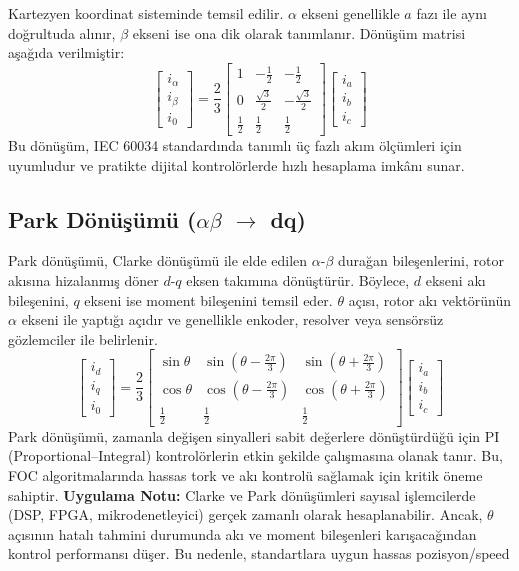 Kartezyen koordinat sisteminde temsil edilir. $\alpha$ ekseni genellikle $a$ fazı ile aynı doğrultuda alınır, $\beta$ ekseni ise ona dik olarak tanımlanır. Dönüşüm matrisi aşağıda verilmiştir: \begin{equation} \begin{bmatrix} i_\alpha \\ i_\beta \\ i_0 \end{bmatrix} = \frac{2}{3} \begin{bmatrix} 1 & -\frac{1}{2} & -\frac{1}{2} \\ 0 & \frac{\sqrt{3}}{2} & -\frac{\sqrt{3}}{2} \\ \frac12 & \frac12 & \frac12 \end{bmatrix} \begin{bmatrix} i_a \\ i_b \\ i_c \end{bmatrix} \end{equation} Bu dönüşüm, IEC 60034 standardında tanımlı üç fazlı akım ölçümleri için uyumludur ve pratikte dijital kontrolörlerde hızlı hesaplama imkânı sunar. \subsection{Park Dönüşümü ($\alpha\beta$ $\rightarrow$ dq)} Park dönüşümü, Clarke dönüşümü ile elde edilen $\alpha$-$\beta$ durağan bileşenlerini, rotor akısına hizalanmış döner $d$-$q$ eksen takımına dönüştürür. Böylece, $d$ ekseni akı bileşenini, $q$ ekseni ise moment bileşenini temsil eder. $\theta$ açısı, rotor akı vektörünün $\alpha$ ekseni ile yaptığı açıdır ve genellikle enkoder, resolver veya sensörsüz gözlemciler ile belirlenir. \begin{equation} \begin{bmatrix} i_d \\ i_q \\ i_0 \end{bmatrix} = \frac{2}{3} \begin{bmatrix} \sin\theta & \sin\left(\theta-\frac{2\pi}{3}\right) & \sin\left(\theta+\frac{2\pi}{3}\right) \\ \cos\theta & \cos\left(\theta-\frac{2\pi}{3}\right) & \cos\left(\theta+\frac{2\pi}{3}\right) \\ \frac12 & \frac12 & \frac12 \end{bmatrix} \begin{bmatrix} i_a \\ i_b \\ i_c \end{bmatrix} \end{equation} Park dönüşümü, zamanla değişen sinyalleri sabit değerlere dönüştürdüğü için PI (Proportional–Integral) kontrolörlerin etkin şekilde çalışmasına olanak tanır. Bu, FOC algoritmalarında hassas tork ve akı kontrolü sağlamak için kritik öneme sahiptir. \textbf{Uygulama Notu:} Clarke ve Park dönüşümleri sayısal işlemcilerde (DSP, FPGA, mikrodenetleyici) gerçek zamanlı olarak hesaplanabilir. Ancak, $\theta$ açısının hatalı tahmini durumunda akı ve moment bileşenleri karışacağından kontrol performansı düşer. Bu nedenle, standartlara uygun hassas pozisyon/speed 
